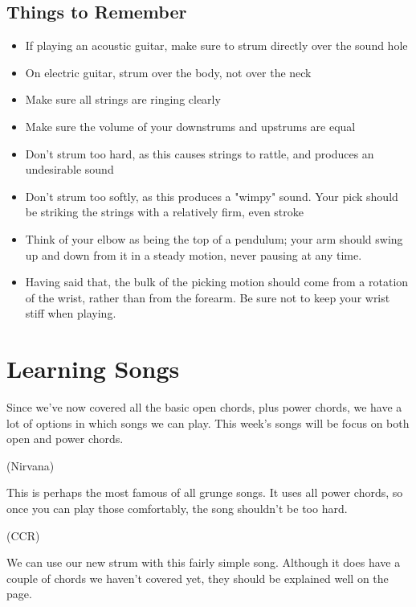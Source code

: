 \subsection{Things to Remember}
\begin{itemize}
\item If playing an acoustic guitar, make sure to strum directly over the sound hole
\item On electric guitar, strum over the body, not over the neck
\item Make sure all strings are ringing clearly
\item Make sure the volume of your downstrums and upstrums are equal
\item Don't strum too hard, as this causes strings to rattle, and produces an
      undesirable sound
\item Don't strum too softly, as this produces a "wimpy" sound. Your pick
      should be striking the strings with a relatively firm, even stroke
\item Think of your elbow as being the top of a pendulum; your arm should swing
      up and down from it in a steady motion, never pausing at any time.
\item Having said that, the bulk of the picking motion should come from a
      rotation of the wrist, rather than from the forearm. Be sure not to keep your
      wrist stiff when playing.
\end{itemize}

\section{Learning Songs}
Since we've now covered all the basic open chords, plus power chords, we have a
lot of options in which songs we can play. This week's songs will be focus on
both open and power chords.

 (Nirvana)

This is perhaps the most famous of all grunge songs. It uses all power chords, so once you can play those comfortably, the song shouldn't be too hard.

 (CCR)

We can use our new strum with this fairly simple song. Although it does have a couple of chords we haven't covered yet, they should be explained well on the page.


